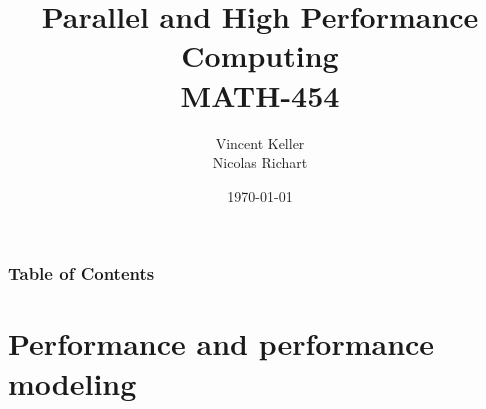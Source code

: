 \documentclass{beamer}
\title{Parallel and High Performance Computing\\MATH-454}
\author{Vincent Keller \\ Nicolas Richart}
\date{\today}
\begin{document}
\begin{frame}
	\titlepage
\end{frame}




\begin{frame}
\frametitle{Table of Contents}
\tableofcontents[hideallsubsections] 
\end{frame}

\section{Performance and performance modeling}



%
%
%
%
%

%
\end{document}
